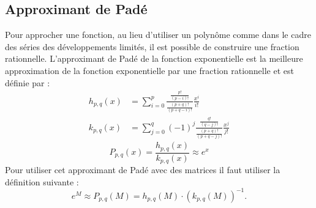 

\subsection{Approximant de Padé}

Pour approcher une fonction, au lieu d'utiliser un polynôme comme dans le cadre des séries des développements limités, il est possible de construire une fraction rationnelle. L'approximant de Padé de la fonction exponentielle est la meilleure approximation de la fonction exponentielle par une fraction rationnelle et est définie par :
$$
  \begin{aligned}
    h_{p,q}(x) &= \sum_{i=0}^p \frac{\frac{p!}{(p-i)!}}{\frac{(p+q)!}{(p+q-i)!}}\frac{x^i}{i!} \\
    k_{p,q}(x) &= \sum_{j=0}^q (-1)^j \frac{\frac{q!}{(q-j)!}}{\frac{(p+q)!}{(p+q-j)!}} \frac{x^j}{j!}
  \end{aligned}
$$
$$
  P_{p,q}(x) = \frac{h_{p,q}(x)}{k_{p,q}(x)} \approx e^x
$$
Pour utiliser cet approximant de Padé avec des matrices il faut utiliser la définition suivante :
$$
  e^M \approx P_{p,q}(M) = h_{p,q}(M)\cdot\left(k_{p,q}(M)\right)^{-1}.
$$

